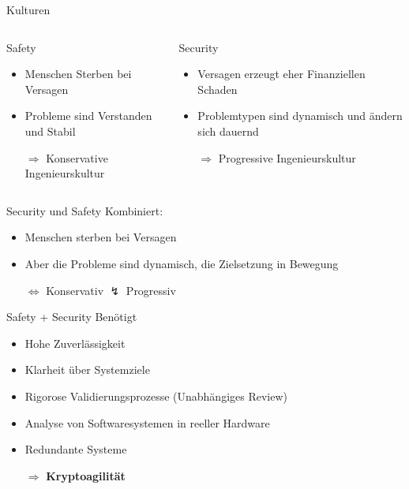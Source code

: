 \begin{frame}[T]{Kulturen}
	\begin{columns}[t,fullwidth]
		\hfill
		\begin{column}{.45\linewidth}
			\begin{block}{Safety}
				\begin{itemize}
				\item Menschen Sterben bei Versagen
				\item Probleme sind Verstanden und Stabil
				\item[$\Rightarrow$] Konservative Ingenieurskultur
				\end{itemize}
			\end{block}
		\end{column}
		\begin{column}{.45\linewidth}
			\begin{block}{Security}
				\begin{itemize}
				\item Versagen erzeugt eher Finanziellen Schaden
				\item Problemtypen sind dynamisch und ändern sich dauernd
				\item[$\Rightarrow$] Progressive Ingenieurskultur
				\end{itemize}
			\end{block}
		\end{column}
		\hfill
	\end{columns}

    \begin{block}{Security und Safety Kombiniert:}
	    \begin{itemize}
	      \item Menschen sterben bei Versagen
	      \item Aber die Probleme sind dynamisch, die Zielsetzung in Bewegung
	      \item[$\Leftrightarrow$] Konservativ $\lightning$ Progressiv
	    \end{itemize}
  	\end{block}
\end{frame}

\begin{frame}[T]{Safety + Security Benötigt}
  \begin{itemize}
    \item Hohe Zuverlässigkeit
    \item Klarheit über Systemziele
    \item Rigorose Validierungsprozesse (Unabhängiges Review)
    \item Analyse von Softwaresystemen in reeller Hardware
    \item Redundante Systeme
    \item[$\Rightarrow$] \textbf{Kryptoagilität}
  \end{itemize}
\end{frame}
